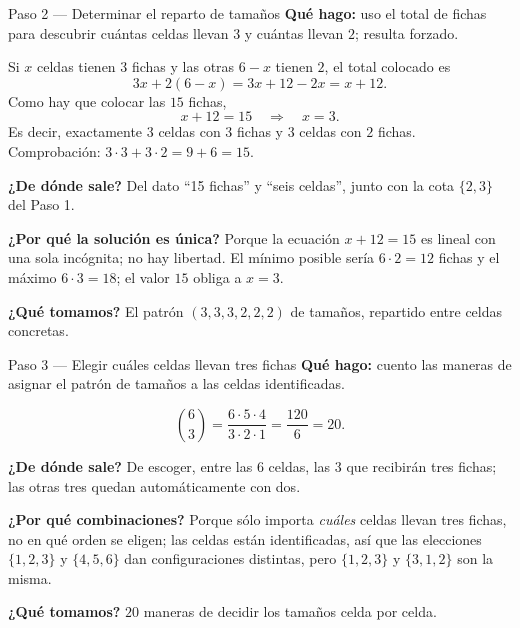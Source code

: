 \documentclass[11pt]{article}
\begin{document}
\begin{paso}{Paso 2 --- Determinar el reparto de tamaños}
\textbf{Qué hago:} uso el total de fichas para descubrir cuántas celdas llevan $3$ y cuántas llevan $2$; resulta forzado.

Si $x$ celdas tienen $3$ fichas y las otras $6-x$ tienen $2$, el total colocado es
\[
3x + 2(6-x) = 3x + 12 - 2x = x + 12 .
\]
Como hay que colocar las $15$ fichas,
\[
x+12 = 15 \quad\Longrightarrow\quad x = 3 .
\]
Es decir, exactamente $3$ celdas con $3$ fichas y $3$ celdas con $2$ fichas. Comprobación: $3\cdot 3 + 3\cdot 2 = 9+6 = 15$.

\textbf{¿De dónde sale?} Del dato ``15 fichas'' y ``seis celdas'', junto con la cota $\{2,3\}$ del Paso 1.

\textbf{¿Por qué la solución es única?} Porque la ecuación $x+12=15$ es lineal con una sola incógnita; no hay libertad. El mínimo posible sería $6\cdot 2 = 12$ fichas y el máximo $6\cdot 3 = 18$; el valor $15$ obliga a $x=3$.

\textbf{¿Qué tomamos?} El patrón $(3,3,3,2,2,2)$ de tamaños, repartido entre celdas concretas.
\end{paso}

\begin{paso}{Paso 3 --- Elegir cuáles celdas llevan tres fichas}
\textbf{Qué hago:} cuento las maneras de asignar el patrón de tamaños a las celdas identificadas.

\[
\binom{6}{3} = \frac{6\cdot 5\cdot 4}{3\cdot 2\cdot 1} = \frac{120}{6} = 20 .
\]

\textbf{¿De dónde sale?} De escoger, entre las $6$ celdas, las $3$ que recibirán tres fichas; las otras tres quedan automáticamente con dos.

\textbf{¿Por qué combinaciones?} Porque sólo importa \emph{cuáles} celdas llevan tres fichas, no en qué orden se eligen; las celdas están identificadas, así que las elecciones $\{1,2,3\}$ y $\{4,5,6\}$ dan configuraciones distintas, pero $\{1,2,3\}$ y $\{3,1,2\}$ son la misma.

\textbf{¿Qué tomamos?} $20$ maneras de decidir los tamaños celda por celda.
\end{paso}
\end{document}
